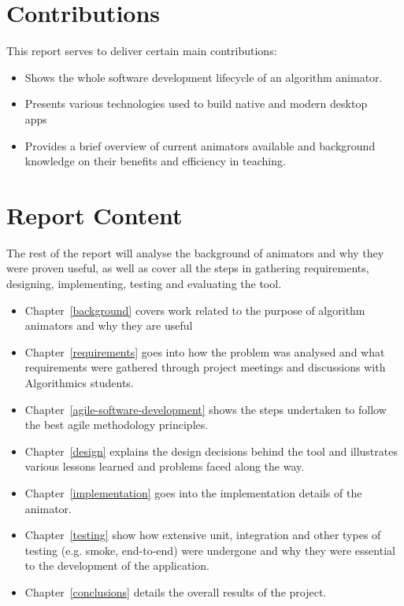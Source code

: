 \documentclass{l4proj}
\begin{document}
\section{Contributions}

This report serves to deliver certain main contributions:

\begin{itemize}
	\item Shows the whole software development lifecycle of an algorithm animator.
	\item Presents various technologies used to build native and modern desktop apps~\cite{electron}~\cite{visjs}
	\item Provides a brief overview of current animators available and background knowledge on their benefits and efficiency in teaching.
\end{itemize}


\section{Report Content}
The rest of the report will analyse the background of animators and why they were proven useful, as well as cover all the steps in gathering requirements, designing, implementing, testing and evaluating the tool.

\begin{itemize}
\item Chapter~\ref{background} covers work related to the purpose of algorithm animators and why they are useful
\item Chapter~\ref{requirements} goes into how the problem was analysed and what requirements were gathered through
	project meetings and discussions with Algorithmics students.
\item Chapter~\ref{agile-software-development} shows the steps undertaken to follow the best agile methodology principles.
\item Chapter~\ref{design} explains the design decisions behind the tool and illustrates various lessons learned and
	problems faced along the way.
\item Chapter~\ref{implementation} goes into the implementation details of the animator.
\item Chapter~\ref{testing} show how extensive unit, integration and other types of testing (e.g. smoke, end-to-end)
	were undergone and why they were essential to the development of the application.
\item Chapter~\ref{conclusions} details the overall results of the project.
\end{itemize}
\end{document}
